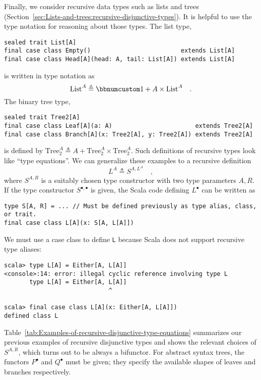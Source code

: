 Finally, we consider recursive data types such as lists and trees
(Section~\ref{sec:Lists-and-trees:recursive-disjunctive-types}).
It is helpful to use the type notation for reasoning about those types.
The list type,
\begin{lstlisting}
sealed trait List[A]
final case class Empty()                         extends List[A]
final case class Head[A](head: A, tail: List[A]) extends List[A]
\end{lstlisting}
is written in type notation as
\[
\text{List}^{A}\triangleq\bbnum 1+A\times\text{List}^{A}\quad.
\]
The binary tree type,
\begin{lstlisting}
sealed trait Tree2[A]
final case class Leaf[A](a: A)                       extends Tree2[A]
final case class Branch[A](x: Tree2[A], y: Tree2[A]) extends Tree2[A]
\end{lstlisting}
is defined by $\text{Tree}_{2}^{A}\triangleq A+\text{Tree}_{2}^{A}\times\text{Tree}_{2}^{A}$.
Such definitions of recursive types look like \textsf{``}type equations\textsf{''}.
We can generalize these examples to a recursive definition
\begin{equation}
L^{A}\triangleq S^{A,L^{A}}\quad,\label{eq:f-def-recursive-functor}
\end{equation}
where $S^{A,R}$ is a suitably chosen type constructor with two type
parameters $A,R$. If the type constructor $S^{\bullet,\bullet}$
is given, the Scala code defining $L^{\bullet}$ can be written as
\begin{lstlisting}
type S[A, R] = ... // Must be defined previously as type alias, class, or trait.
final case class L[A](x: S[A, L[A]])
\end{lstlisting}
We must use a case class to define \lstinline!L! because Scala does
not support recursive type aliases:
\begin{lstlisting}
scala> type L[A] = Either[A, L[A]]
<console>:14: error: illegal cyclic reference involving type L
       type L[A] = Either[A, L[A]]
                             ^

scala> final case class L[A](x: Either[A, L[A]])
defined class L
\end{lstlisting}

Table~\ref{tab:Examples-of-recursive-disjunctive-type-equations}
summarizes our previous examples of recursive disjunctive types and
shows the relevant choices of $S^{A,R}$, which turns out to be always
a bifunctor. For abstract syntax trees, the functors $P^{\bullet}$
and $Q^{\bullet}$ must be given; they specify the available shapes
of leaves and branches respectively. 

